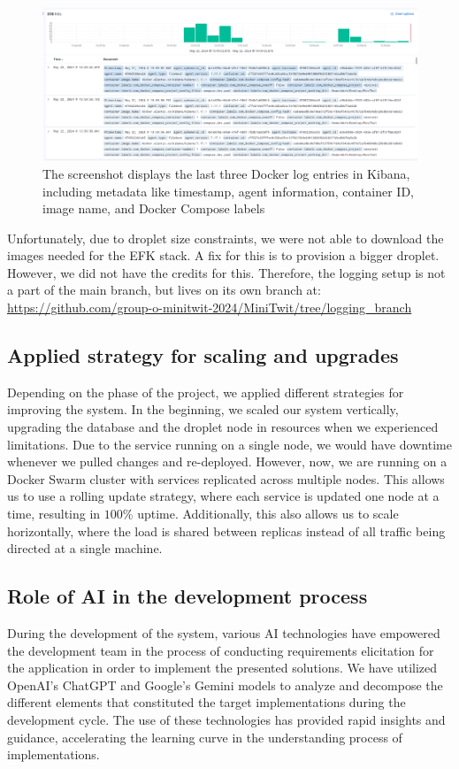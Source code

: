\documentclass[11pt]{article}
\begin{document}
\begin{figure}[h]
    \centering
    \includegraphics[width=0.85\linewidth]{images/efk_docker_logs.png}
    \caption{The screenshot displays the last three Docker log entries in Kibana, including metadata like timestamp, agent information, container ID, image name, and Docker Compose labels}
\end{figure}
Unfortunately, due to droplet size constraints, we were not able to download the images needed for the EFK stack. A fix for this is to provision a bigger droplet. However, we did not have the credits for this. Therefore, the logging setup is not a part of the main branch, but lives on its own branch at: \url{https://github.com/group-o-minitwit-2024/MiniTwit/tree/logging_branch}

\subsection{Applied strategy for scaling and upgrades}
Depending on the phase of the project, we applied different strategies for improving the system. In the beginning, we scaled our system vertically, upgrading the database and the droplet node in resources when we experienced limitations. Due to the service running on a single node, we would have downtime whenever we pulled changes and re-deployed. However, now, we are running on a Docker Swarm cluster with services replicated across multiple nodes. This allows us to use a rolling update strategy, where each service is updated one node at a time, resulting in $100\%$ uptime. Additionally, this also allows us to scale horizontally, where the load is shared between replicas instead of all traffic being directed at a single machine. 


\subsection{Role of AI in the development process}
During the development of the system, various AI technologies have empowered the development team in the process of conducting requirements elicitation for the application in order to implement the presented solutions. We have utilized OpenAI’s ChatGPT and Google's Gemini models to analyze and decompose the different elements that constituted the target implementations during the development cycle. The use of these technologies has provided rapid insights and guidance, accelerating the learning curve in the understanding process of implementations.
\end{document}

